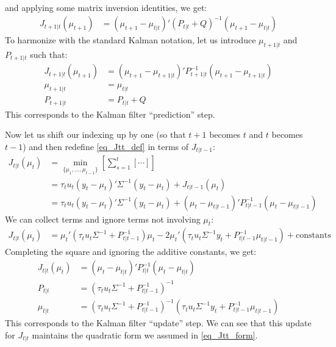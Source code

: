 \documentclass[11pt]{article}
\begin{document}
and applying some matrix inversion identities, we get:
\begin{align*}
	J_{t+1|t}(\mu_{t+1})
	&= (\mu_{t+1} - \mu_{t|t})' (P_{t|t} + Q)^{-1} (\mu_{t+1} - \mu_{t|t})
\end{align*}
To harmonize with the standard Kalman notation, let us introduce $\mu_{t+1|t}$ and $P_{t+1|t}$ such that:
\begin{align}
	J_{t+1|t}(\mu_{t+1}) &= (\mu_{t+1} - \mu_{t+1|t})' P_{t+1|t}^{-1} (\mu_{t+1} - \mu_{t+1|t}) \nonumber \\
	\mu_{t+1|t} &= \mu_{t|t} \label{eq_kf_pred_mu}\\
	P_{t+1|t} &= P_{t|t} + Q \label{eq_kf_pred_P}
\end{align}
This corresponds to the Kalman filter ``prediction'' step.

Now let us shift our indexing up by one (so that $t+1$ becomes $t$ and $t$ becomes $t-1$) and then redefine \eqref{eq_Jtt_def} in terms of $J_{t|t-1}$:
\begin{align*}
	J_{t|t}(\mu_t) 
	&= \min_{\{\mu_1, \dotsc, \mu_{t-1}\}} \left[ \sum_{s=1}^t [ \cdots ] \right] \\
	&= \tau_t u_t (y_t - \mu_t)' \Sigma^{-1} (y_t - \mu_t) + J_{t|t-1}(\mu_t) \\
	&= \tau_t u_t (y_t - \mu_t)' \Sigma^{-1} (y_t - \mu_t) + (\mu_t - \mu_{t|t-1})' P_{t|t-1}^{-1} (\mu_t - \mu_{t|t-1})
\end{align*}
We can collect terms and ignore terms not involving $\mu_t$:
\begin{align*}
	J_{t|t}(\mu_t) 
	&= \mu_t'(\tau_t u_t \Sigma^{-1} + P_{t|t-1}^{-1}) \mu_t 
	- 2 \mu_t' (\tau_t u_t \Sigma^{-1} y_t + P_{t|t-1}^{-1}\mu_{t|t-1}) + \mathrm{constants}
\end{align*}
Completing the square and ignoring the additive constants, we get:
\begin{align}
	J_{t|t}(\mu_t) &= (\mu_t - \mu_{t|t})' P_{t|t}^{-1} (\mu_t - \mu_{t|t}) \nonumber \\
	P_{t|t} &= \left(\tau_t u_t \Sigma^{-1} + P_{t|t-1}^{-1}\right)^{-1} \label{eq_kf_P} \\
	\mu_{t|t} &= \left(\tau_t u_t \Sigma^{-1} + P_{t|t-1}^{-1}\right)^{-1}(\tau_t u_t \Sigma^{-1} y_t + P_{t|t-1}^{-1}\mu_{t|t-1}) \label{eq_kf_mu}
\end{align}
This corresponds to the Kalman filter ``update'' step. We can see that this update for $J_{t|t}$ maintains the quadratic form we assumed in \eqref{eq_Jtt_form}.
\end{document}
